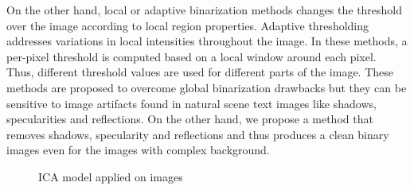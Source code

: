 On the other hand, local or adaptive binarization \cite{A8} methods changes the threshold over the image according to local region properties.
Adaptive thresholding addresses variations in local intensities throughout the image.
In these methods, a per-pixel threshold is computed based on a local window around each pixel. 
Thus, different threshold values are used for different parts of the image. 
These methods are proposed to overcome global binarization drawbacks but they can be sensitive
to image artifacts found in natural scene text images like shadows, specularities and reflections.
On the other hand, we propose a method that removes shadows, specularity and reflections and thus produces a clean 
binary images even for the images with complex background.
\begin{figure}[t]
\centering
{}
\caption
{ICA model applied on images}
\label{fig:ICAmodel}
\end{figure}
